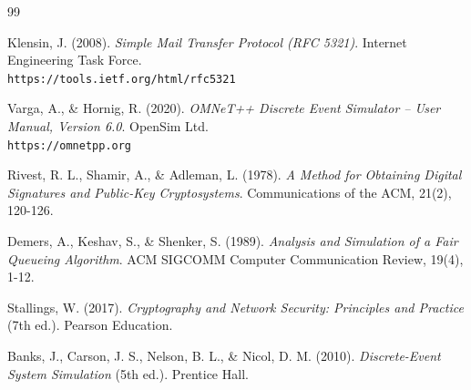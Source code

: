 \documentclass[12pt]{article}
\begin{document}
	\begin{thebibliography}{99}
		
		Klensin, J. (2008). \textit{Simple Mail Transfer Protocol (RFC 5321)}. Internet Engineering Task Force. \\
		\texttt{https://tools.ietf.org/html/rfc5321}
		
		Varga, A., \& Hornig, R. (2020). \textit{OMNeT++ Discrete Event Simulator -- User Manual, Version 6.0}. OpenSim Ltd. \\
		\texttt{https://omnetpp.org}
		
		Rivest, R. L., Shamir, A., \& Adleman, L. (1978). \textit{A Method for Obtaining Digital Signatures and Public-Key Cryptosystems}. Communications of the ACM, 21(2), 120-126.
		
		Demers, A., Keshav, S., \& Shenker, S. (1989). \textit{Analysis and Simulation of a Fair Queueing Algorithm}. ACM SIGCOMM Computer Communication Review, 19(4), 1-12.
		
		Stallings, W. (2017). \textit{Cryptography and Network Security: Principles and Practice} (7th ed.). Pearson Education.
		
		Banks, J., Carson, J. S., Nelson, B. L., \& Nicol, D. M. (2010). \textit{Discrete-Event System Simulation} (5th ed.). Prentice Hall.
		
	\end{thebibliography}
	
\end{document}
